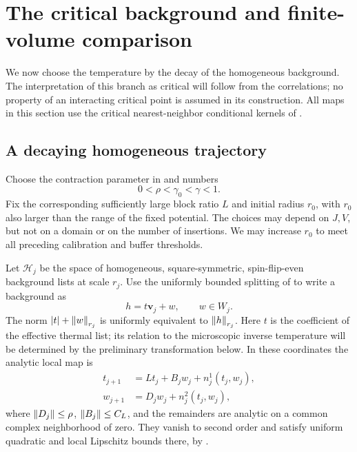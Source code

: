\section{The critical background and finite-volume comparison}
\label{flow:section}

We now choose the temperature by the decay of the homogeneous background.
The interpretation of this branch as critical will follow from the
correlations; no property of an interacting critical point is assumed
in its construction.  All maps in this section use the critical
nearest-neighbor conditional kernels of .

\subsection{A decaying homogeneous trajectory}

Choose the contraction parameter in  and numbers
\begin{equation}\label{flow:rates}
                 0<\rho<\gamma_0<\gamma<1.
\end{equation}
Fix the corresponding sufficiently large block ratio $L$ and initial
radius $r_0$, with $r_0$ also larger than the range of the fixed potential.
The choices may depend on $J,V$, but not on a domain or on the number of
insertions.  We may increase $r_0$ to meet all preceding calibration and
buffer thresholds.

Let $\mathcal H_j$ be the space of homogeneous, square-symmetric,
spin-flip-even background lists at scale $r_j$.  Use the uniformly
bounded splitting of  to write a background as
\[
                 h=t\boldsymbol v_j+w,\qquad w\in W_j.
\]
The norm $|t|+\left\|w\right\|_{r_j}$ is uniformly equivalent to
$\left\|h\right\|_{r_j}$.  Here $t$ is the coefficient of the effective thermal
list; its relation to the microscopic inverse temperature will be
determined by the preliminary transformation below.  In these
coordinates the analytic local map is
\begin{equation}\label{flow:coordinate-map}
\begin{split}
 t_{j+1}&=Lt_j+B_jw_j+n_j^1(t_j,w_j),\\
 w_{j+1}&=D_jw_j+n_j^2(t_j,w_j),
\end{split}
\end{equation}
where $\left\|D_j\right\|\le\rho$, $\left\|B_j\right\|\le C_L$, and the remainders
are analytic on a common complex neighborhood of zero.  They vanish
to second order and satisfy uniform quadratic and local Lipschitz
bounds there, by .

